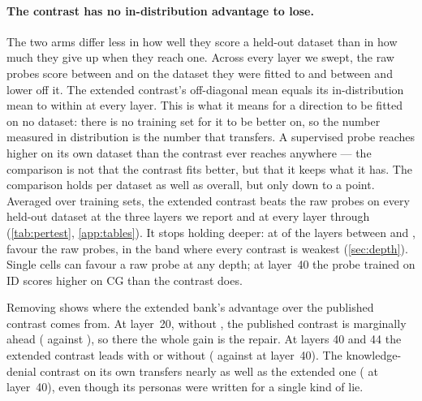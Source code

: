 \paragraph{The contrast has no in-distribution advantage to lose.} The two arms differ less in how
well they score a held-out dataset than in how much they give up when they reach one. Across every
layer we swept, the raw probes score between  and 
on the dataset they were fitted to and between  and 
lower off it. The extended contrast's off-diagonal mean equals its in-distribution mean to within
 at every layer. This is what it means for a direction to be fitted on no
dataset: there is no training set for it to be better on, so the number measured in distribution is
the number that transfers. A supervised probe reaches higher on its own dataset than the contrast
ever reaches anywhere --- the comparison is not that the contrast fits better, but that it keeps
what it has. The comparison holds per dataset as well as overall, but only down to a point. Averaged over
training sets, the extended contrast beats the raw probes on every held-out dataset at the three
layers we report and at every layer through 
(\cref{tab:pertest}, \cref{app:tables}). It stops holding deeper: at
 of the layers between  and
,  favour the raw probes, in the band where
every contrast is weakest (\cref{sec:depth}). Single cells can favour a raw probe at any depth; at
layer~40 the probe trained on ID scores higher on CG than the contrast does.

\begin{table}[t]
\centering
\small
\caption{Mean off-diagonal AUROC of the transfer matrix, at three layers, over all six test sets
and with \hpkr{} removed as both a training and a test set. The 1-d rows are persona contrasts, a
probe on one feature. The best value in each column is in bold.}
\label{tab:transfer}

\end{table}

Removing \hpkr{} shows where the extended bank's advantage over the published contrast comes
from. At layer~20, without \hpkr, the published contrast is marginally ahead (
against ), so there the whole gain is the \hpkr{} repair. At layers 40 and 44 the
extended contrast leads with or without \hpkr{} ( against  at
layer~40). The knowledge-denial contrast on its own transfers nearly as well as the extended one
( at layer~40), even though its personas were written for a single kind of lie.

